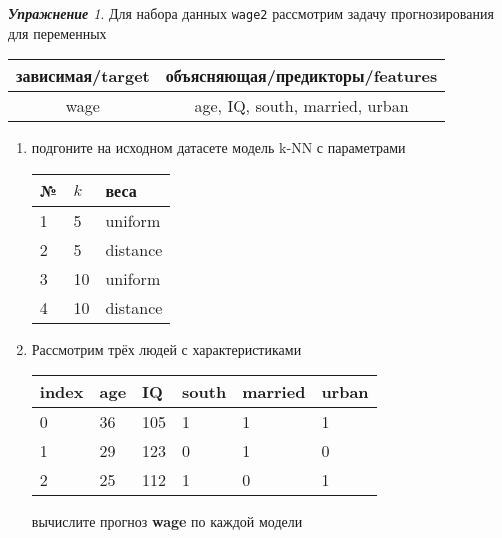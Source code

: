 \documentclass[a4,12pt]{article}
\theoremstyle{remark}
\newtheorem{exercise}{\textbf{Упражнение}}[section]
\begin{document}
\begin{exercise}
Для набора данных \texttt{wage2} рассмотрим задачу прогнозирования
для переменных
\begin{center}
	\begin{tabular}{|c|c|}\hline
		зависимая/target & объясняющая/предикторы/features \\ \hline
		wage & age, IQ, south, married, urban \\ \hline
	\end{tabular}
\end{center}
\begin{enumerate}
	\item подгоните на исходном датасете модель k-NN с параметрами
	\begin{center}
		\begin{tabular}{|l|l|l|}\hline
		№ & \(k\) & веса \\ \hline
		1 & 5 & uniform \\
		2 & 5 & distance \\
		3 & 10 & uniform \\
		4 & 10 & distance \\ \hline
		\end{tabular}
	\end{center}
	\item Рассмотрим трёх людей с характеристиками
	\begin{center}
		\begin{tabular}{|l||l|l|l|l|l|}\hline
			index & age & IQ & south & married & urban \\ \hline\hline
			0 & 36 & 105 & 1 & 1 & 1 \\
			1 & 29 & 123 & 0 & 1 & 0 \\
			2 & 25 & 112 & 1 & 0 & 1 \\ \hline
		\end{tabular}
	\end{center}
	вычислите прогноз \textbf{wage} по каждой модели
\end{enumerate}
\end{exercise}
\end{document}
